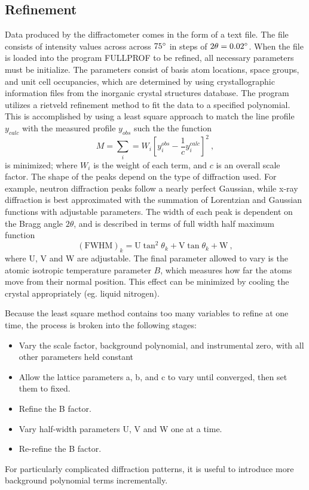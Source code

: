 \documentclass[12pt]{article}
\begin{document}
\subsection{Refinement}
Data produced by the diffractometer comes in the form of a text file. The file consists of intensity values across across $75\degree$ in steps of $2\theta = 0.02\degree$. When the file is loaded into the program FULLPROF to be refined, all necessary parameters must be initialize. The parameters consist of basis atom locations, space groups, and unit cell occupancies, which are determined by using crystallographic information files from the inorganic crystal structures database. The program utilizes a rietveld refinement method to fit the data to a specified polynomial. This is accomplished by using a least square approach to match the line profile $y_{calc}$ with the measured profile $y_{obs}$ such the the function \cite{Rietveld}
\begin{equation}
M = \sum_i = W_i\left[ y_i^{obs} - \frac{1}{c}y_i^{calc} \right]^2\:,
\end{equation} 
is minimized; where $W_i$ is the weight of each term, and $c$ is an overall scale factor. The shape of the peaks depend on the type of diffraction used. For example, neutron diffraction peaks follow a nearly perfect Gaussian, while x-ray diffraction is best approximated with the summation of Lorentzian and Gaussian functions with adjustable parameters. The width of each peak is dependent on the Bragg angle $2\theta$, and is described in terms of full width half maximum function
\begin{equation}
(\text{FWHM})_k = \text{U}\tan^2\theta_k + \text{V}\tan\theta_k + \text{W}\:,
\end{equation}
where U, V and W are adjustable. The final parameter allowed to vary is the atomic isotropic temperature parameter $B$, which measures how far the atoms move from their normal position. This effect can be minimized by cooling the crystal appropriately (eg. liquid nitrogen).

\noindent
Because the least square method contains too many variables to refine at one time, the process is broken into the following stages:
\begin{itemize}
\item Vary the scale factor, background polynomial, and instrumental zero, with all other parameters held constant
\item Allow the lattice parameters a, b, and c to vary until converged, then set them to fixed.
\item Refine the B factor. 
\item Vary half-width parameters U, V and W one at a time. 
\item Re-refine the B factor.
\end{itemize}
For particularly complicated diffraction patterns, it is useful to introduce more background polynomial terms incrementally.
\newpage
\end{document}
